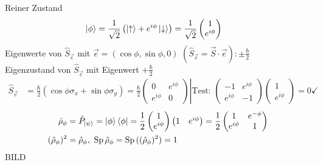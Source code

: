 	Reiner Zustand
		\begin{align*}
			\ket{\phi} &= \frac{1}{\sqrt{2}} \left(
				\ket{\uparrow} + e^{i\phi} \ket{\downarrow}
			\right) = \frac{1}{\sqrt{2}} 
			\begin{pmatrix}
				1 \\
				e^{i\phi}
			\end{pmatrix}
		\end{align*}
	Eigenwerte von $\hat{S}_{\vec{e}}$ mit $\vec{e} = (\cos\phi , \sin \phi, 0)$
	$(\hat{S}_{\vec{e}} = \vec{S} \cdot \vec{e}) : \pm \frac{\hbar}{2}$ \\
	Eigenzustand von $\hat{S}_{\vec{e}}$ mit Eigenwert $+ \frac{\hbar}{2}$ 
		\begin{align*}
			\hat{S}_{\vec{e}} &= 
			\frac{\hbar}{2} \left(
				\cos \phi \sigma_x + \sin \phi \sigma_y 
			\right) = 
			\frac{\hbar}{2}
			\left. 
			\begin{pmatrix}
				0 & e^{i\phi} \\
				e^{i\phi} & 0 
			\end{pmatrix}
			\right| 
			\text{Test: }
			\begin{pmatrix}
				-1 & e^{i\phi} \\
				e^{i\phi} & -1
			\end{pmatrix}
			\begin{pmatrix}
			1 \\
			e^{i\phi}
			\end{pmatrix}
			= 0 \checkmark
		\end{align*}
		\begin{align*}
			\hat{\rho}_\phi &= \hat{P}_{\ket{\psi}} = \ket{\phi} \bra{\phi} 
			= \frac{1}{2} 
			\begin{pmatrix}
				1 \\
				e^{i\phi}
			\end{pmatrix}
			\begin{pmatrix}
				1 & e^{i\phi}
			\end{pmatrix}
			= \frac{1}{2}
			\begin{pmatrix}
				1 & e^{-\phi} \\
				e^{i\phi} & 1
			\end{pmatrix} \\
			(\hat{\rho}_\phi)^2 &= \hat{\rho}_\phi, ~
			\mathrm{Sp}\, \hat{\rho}_\phi = \mathrm{Sp}\, ((\hat{\rho}_\phi)^2) = 1
		\end{align*}
	BILD
	
